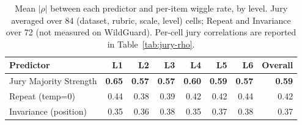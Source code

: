 \begin{table}[t]
\centering
\small
\caption{Mean $|\rho|$ between each predictor and per-item wiggle rate, by level. Jury averaged over 84 
(dataset, rubric, scale, level) cells; Repeat and Invariance over 72 (not measured on WildGuard). 
Per-cell jury correlations are reported in Table~\ref{tab:jury-rho}.}
\label{tab:predictor-comparison}
\begin{tabular}{@{}lrrrrrrr@{}}
\toprule
\textbf{Predictor} & \textbf{L1} & \textbf{L2} & \textbf{L3} & \textbf{L4} & \textbf{L5} & \textbf{L6} & \textbf{Overall} \\
\midrule
Jury Majority Strength & \textbf{0.65} & \textbf{0.57} & \textbf{0.57} & \textbf{0.60} & \textbf{0.59} & \textbf{0.57} & \textbf{0.59} \\
Repeat (temp=0)        & 0.44 & 0.38 & 0.39 & 0.42 & 0.42 & 0.44 & 0.42 \\
Invariance (position)  & 0.35 & 0.36 & 0.38 & 0.35 & 0.37 & 0.38 & 0.37 \\
\bottomrule
\end{tabular}
\end{table}

